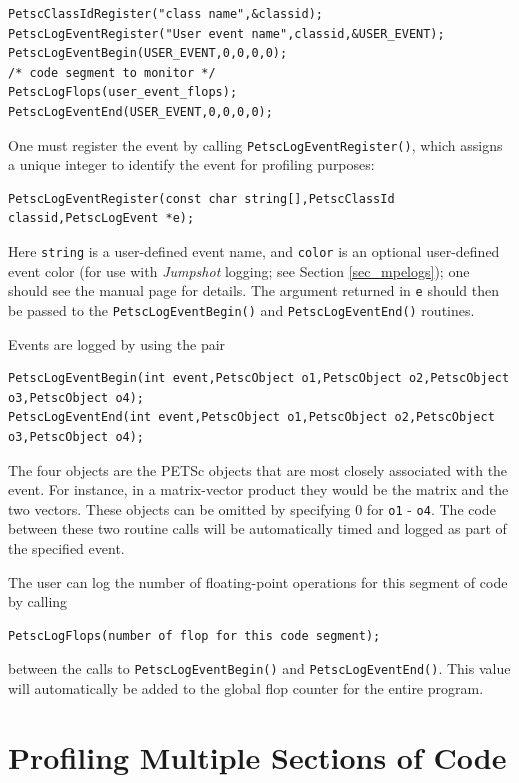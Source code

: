{{\begin{lstlisting}
PetscClassIdRegister("class name",&classid);
PetscLogEventRegister("User event name",classid,&USER_EVENT);
PetscLogEventBegin(USER_EVENT,0,0,0,0);
/* code segment to monitor */
PetscLogFlops(user_event_flops);
PetscLogEventEnd(USER_EVENT,0,0,0,0);
\end{lstlisting}

One must register the event by calling \lstinline{PetscLogEventRegister()}, which assigns a unique integer to identify the
event for profiling purposes:
\begin{lstlisting}
PetscLogEventRegister(const char string[],PetscClassId classid,PetscLogEvent *e);
\end{lstlisting}
Here \lstinline{string} is a user-defined event name, and \lstinline{color} is an
optional user-defined event color (for use with {\em Jumpshot} logging; see Section \ref{sec_mpelogs});
one should see the manual page for details.  The argument returned in \lstinline{e} should then
be passed to the \lstinline{PetscLogEventBegin()} and \lstinline{PetscLogEventEnd()}
routines.

Events are logged by using the pair
\begin{lstlisting}
PetscLogEventBegin(int event,PetscObject o1,PetscObject o2,PetscObject o3,PetscObject o4);
PetscLogEventEnd(int event,PetscObject o1,PetscObject o2,PetscObject o3,PetscObject o4);
\end{lstlisting}
The four objects are the PETSc objects that are most closely associated
with the event.  For instance, in a matrix-vector product they
would be the matrix and the two vectors.  These objects can be omitted
by specifying 0 for \lstinline{o1} - \lstinline{o4}.  The code between these
two routine calls will be automatically timed and logged as part of the
specified event.

The user can log the number of floating-point operations
for this segment of code by calling
\begin{lstlisting}
PetscLogFlops(number of flop for this code segment);
\end{lstlisting}
between the calls to \lstinline{PetscLogEventBegin()} and \lstinline{PetscLogEventEnd()}.
This value will automatically be added to the global flop counter for the
entire program.

\section{Profiling Multiple Sections of Code}
\label{sec_profstages}

}}
